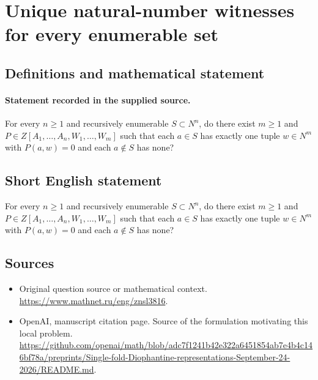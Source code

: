\documentclass[11pt]{article}
\begin{document}
\section*{Unique natural-number witnesses for every enumerable set}\label{30007204}
\subsection{Definitions and mathematical statement}
\paragraph{Statement recorded in the supplied source.}
For every $n\geq 1$ and recursively enumerable $S\subset N^{n}$, do there exist $m\geq 1$ and $P\in Z[A_{1},\dots ,A_{n},W_{1},\dots ,W_m]$ such that each $a\in S$ has exactly one tuple $w\in N^m$ with $P(a,w)=0$ and each $a\notin S$ has none?
\subsection{Short English statement}
For every $n\geq 1$ and recursively enumerable $S\subset N^{n}$, do there exist $m\geq 1$ and $P\in Z[A_{1},\dots ,A_{n},W_{1},\dots ,W_m]$ such that each $a\in S$ has exactly one tuple $w\in N^m$ with $P(a,w)=0$ and each $a\notin S$ has none?
\subsection{Sources}
\begin{itemize}
\item[S1] Original question source or mathematical context.
\url{https://www.mathnet.ru/eng/znsl3816}.
\item[S2] OpenAI, manuscript citation page. Source of the formulation motivating this local problem.
\url{https://github.com/openai/math/blob/adc7f1241b42e322a6451854ab7e4b4c146bf78a/preprints/Single-fold-Diophantine-representations-September-24-2026/README.md}.
\end{itemize}
\end{document}
